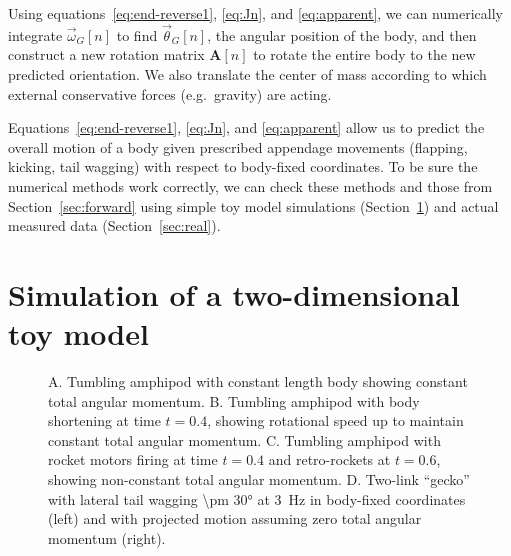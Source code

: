 Using equations~\ref{eq:end-reverse1}, \ref{eq:Jn}, and \ref{eq:apparent}, we can numerically integrate $\vec\omega_G[n]$ to find $\vec\theta_G[n]$, the angular position of the body, and then construct a new rotation matrix $\mathbf{A}[n]$ to rotate the entire body to the new predicted orientation.  We also translate the center of mass according to which external conservative forces (e.g.\ gravity) are acting.

Equations~\ref{eq:end-reverse1}, \ref{eq:Jn}, and \ref{eq:apparent} allow us to predict the overall motion of a body given prescribed appendage movements (flapping, kicking, tail wagging) with respect to body-fixed coordinates.  To be sure the numerical methods work correctly, we can check these methods and those from Section~\ref{sec:forward} using simple toy model simulations (Section~\ref{sec:toy}) and actual measured data (Section~\ref{sec:real}). 

\section{Simulation of a two-dimensional toy model}
\label{sec:toy}

\begin{figure}

\caption{A. Tumbling amphipod with constant length body showing constant total angular momentum. B. Tumbling amphipod with body shortening at time $t=0.4$, showing rotational speed up to maintain constant total angular momentum. C. Tumbling amphipod with rocket motors firing at time $t=0.4$ and retro-rockets at $t=0.6$, showing non-constant total angular momentum. D. Two-link ``gecko'' with lateral tail wagging \ang{\pm 30} at \SI{3}{\hertz} in body-fixed coordinates (left) and with projected motion assuming zero total angular momentum (right).}
\label{fig:toysim}
\end{figure}


